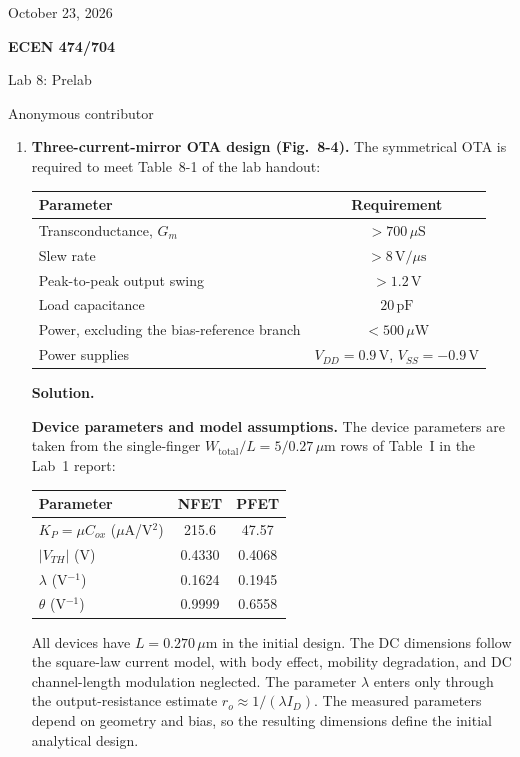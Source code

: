 \documentclass[12pt,letterpaper]{article}
\newcommand{\um}{\,\mu\mathrm{m}}
\newcommand{\uS}{\,\mu\mathrm{S}}
\newcommand{\uW}{\,\mu\mathrm{W}}
\newcommand{\V}{\,\mathrm{V}}
\newcommand{\pF}{\,\mathrm{pF}}
\newcommand{\Vus}{\,\mathrm{V}/\mu\mathrm{s}}
\begin{document}
{\fontsize{11}{12.65}\selectfont
\hfill October 23, 2026\par}
{\centering
{\fontsize{14}{16.1}\selectfont\sffamily\bfseries ECEN 474/704\par}
{\fontsize{14}{16.1}\selectfont Lab 8: Prelab\par}
{\fontsize{14}{16.1}\selectfont Anonymous contributor\par}
}
\vspace{12pt}
\begin{enumerate}

\item \textbf{Three-current-mirror OTA design (Fig.~8-4).}
The symmetrical OTA is required to meet Table~8-1 of the lab handout:
\begin{center}
\small
\begin{tabular}{@{}lc@{}}
\toprule
Parameter & Requirement\\
\midrule
Transconductance, $G_m$ & $>700\uS$\\
Slew rate & $>8\Vus$\\
Peak-to-peak output swing & $>1.2\V$\\
Load capacitance & $20\pF$\\
Power, excluding the bias-reference branch & $<500\uW$\\
Power supplies & $V_{DD}=0.9\V$, $V_{SS}=-0.9\V$\\
\bottomrule
\end{tabular}
\end{center}

\textbf{Solution.}

\textbf{Device parameters and model assumptions.}
The device parameters are taken from the single-finger
$W_{\mathrm{total}}/L=5/0.27\um$ rows of Table~I in the Lab~1 report:
\begin{center}
\small
\begin{tabular}{@{}lcc@{}}
\toprule
Parameter & NFET & PFET\\
\midrule
$K_P=\mu C_{ox}$ ($\mu$A/V$^2$) & 215.6 & 47.57\\
$|V_{TH}|$ (V) & 0.4330 & 0.4068\\
$\lambda$ (V$^{-1}$) & 0.1624 & 0.1945\\
$\theta$ (V$^{-1}$) & 0.9999 & 0.6558\\
\bottomrule
\end{tabular}
\end{center}
All devices have $L=0.270\um$ in the initial design. The DC
dimensions follow the square-law current model, with body effect,
mobility degradation, and DC channel-length modulation neglected.
The parameter $\lambda$ enters only through the output-resistance
estimate $r_o\approx1/(\lambda I_D)$.
The measured parameters depend on geometry and bias, so the
resulting dimensions define the initial analytical design.


\end{enumerate}
\end{document}
